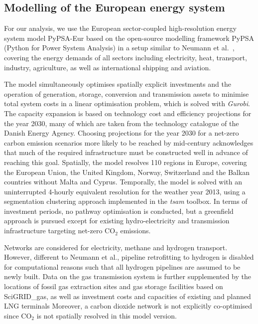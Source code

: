 

\subsection*{Modelling of the European energy system}

For our analysis, we use the European sector-coupled high-resolution energy
system model PyPSA-Eur\cite{horschPyPSAEurOpen2018a} based on the open-source
modelling framework PyPSA\cite{brownPyPSAPython2018} (Python for Power System
Analysis) in a setup similar to Neumann et al.~\cite{neumannPotentialRole2023},
covering the energy demands of all sectors including electricity, heat,
transport, industry, agriculture, as well as international shipping and
aviation.

The model simultaneously optimises spatially explicit investments and the
operation of generation, storage, conversion and transmission assets to minimise
total system costs in a linear optimisation problem, which is solved with
\textit{Gurobi}.\cite{gurobi} The capacity expansion is based on technology cost
and efficiency projections for the year 2030, many of which are taken from the
technology catalogue of the Danish Energy Agency.\cite{DEA} Choosing projections
for the year 2030 for a net-zero carbon emission scenarios more likely to be
reached by mid-century acknowledges that much of the required infrastructure
must be constructed well in advance of reaching this goal. Spatially, the model
resolves 110 regions in Europe,\cite{frysztackiStrongEffect2021} covering the
European Union, the United Kingdom, Norway, Switzerland and the Balkan countries
without Malta and Cyprus. Temporally, the model is solved with an uninterrupted
4-hourly equivalent resolution for the weather year 2013, using a segmentation
clustering approach implemented in the \textit{tsam}
toolbox.\cite{hoffmannParetooptimalTemporal2022} In terms of investment periods,
no pathway optimisation is conducted, but a greenfield approach is pursued
except for existing hydro-electricity and transmission infrastructure targeting
net-zero CO$_2$ emissions.

Networks are considered for electricity, methane and hydrogen
transport.\cite{ENTSOE,plutaSciGRIDGas2022a} However, different to Neumann et
al.,\cite{neumannPotentialRole2023} pipeline retrofitting to hydrogen is
disabled for computational reasons such that all hydrogen pipelines are assumed
to be newly built. Data on the gas transmission system is further supplemented
by the locations of fossil gas extraction sites and gas storage facilities based
on SciGRID\_gas,\cite{plutaSciGRIDGas2022a} as well as investment costs and
capacities of existing and planned LNG
terminals\cite{instituteforenergyeconomicsandfinancialanalysisEuropeanLNG2023}
Moreover, a carbon dioxide network is not explicitly co-optimised since CO$_2$
is not spatially resolved in this model version.\cite{hofmannDesigningCO22023}

